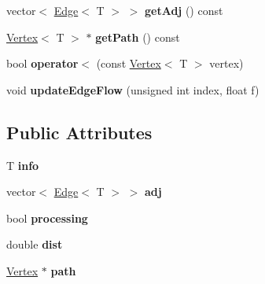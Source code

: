 \begin{DoxyCompactItemize}
\item 
\hypertarget{classVertex_a4d8021f4861cc4195af3ecf042a015cc}{vector$<$ \hyperlink{classEdge}{Edge}$<$ T $>$ $>$ {\bfseries get\-Adj} () const }\label{classVertex_a4d8021f4861cc4195af3ecf042a015cc}

\item 
\hypertarget{classVertex_ae0b57c953450db1679e5f5994e1ba738}{\hyperlink{classVertex}{Vertex}$<$ T $>$ $\ast$ {\bfseries get\-Path} () const }\label{classVertex_ae0b57c953450db1679e5f5994e1ba738}

\item 
\hypertarget{classVertex_a7091b26f281a5041b1775a3d3f9cb7a6}{bool {\bfseries operator$<$} (const \hyperlink{classVertex}{Vertex}$<$ T $>$ vertex)}\label{classVertex_a7091b26f281a5041b1775a3d3f9cb7a6}

\item 
\hypertarget{classVertex_abc0db834c5ea38fa4ceb20f231040e7b}{void {\bfseries update\-Edge\-Flow} (unsigned int index, float f)}\label{classVertex_abc0db834c5ea38fa4ceb20f231040e7b}

\end{DoxyCompactItemize}
\subsection*{Public Attributes}
\begin{DoxyCompactItemize}
\item 
\hypertarget{classVertex_a415d7811eef6cdd992f0dca1f35a49cd}{T {\bfseries info}}\label{classVertex_a415d7811eef6cdd992f0dca1f35a49cd}

\item 
\hypertarget{classVertex_a5d9dfdd2caee11e300ff5142799345a1}{vector$<$ \hyperlink{classEdge}{Edge}$<$ T $>$ $>$ {\bfseries adj}}\label{classVertex_a5d9dfdd2caee11e300ff5142799345a1}

\item 
\hypertarget{classVertex_ae575d4b9a6b1ada3f9626c458c060f54}{bool {\bfseries processing}}\label{classVertex_ae575d4b9a6b1ada3f9626c458c060f54}

\item 
\hypertarget{classVertex_a08a2b813e77f97aa8b6c1d252e5417f7}{double {\bfseries dist}}\label{classVertex_a08a2b813e77f97aa8b6c1d252e5417f7}

\item 
\hypertarget{classVertex_abd40febd917aa25add6bd42237c8463a}{\hyperlink{classVertex}{Vertex} $\ast$ {\bfseries path}}\label{classVertex_abd40febd917aa25add6bd42237c8463a}

\end{DoxyCompactItemize}
